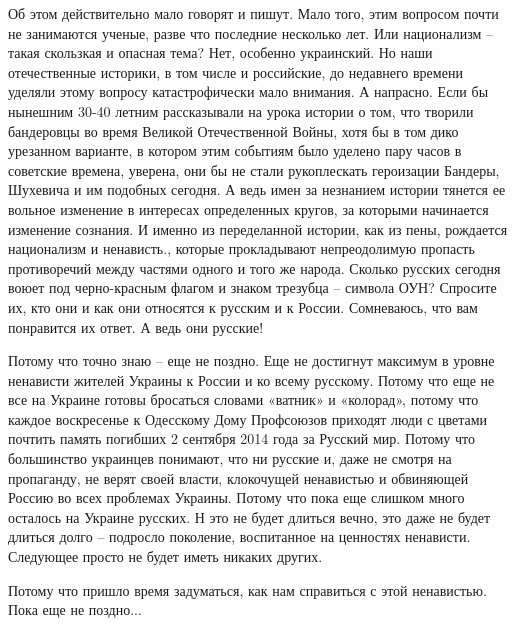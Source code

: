 Об этом действительно мало говорят и пишут. Мало того, этим вопросом почти не
занимаются ученые, разве что последние несколько лет. Или национализм – такая
скользкая и опасная тема? Нет, особенно украинский. Но наши отечественные
историки, в том числе и российские, до недавнего времени уделяли этому вопросу
катастрофически мало внимания. А напрасно. Если бы нынешним 30-40 летним
рассказывали на урока истории о том, что творили бандеровцы во время Великой
Отечественной Войны, хотя бы в том дико урезанном варианте, в котором этим
событиям было уделено пару часов в советские времена, уверена, они бы не стали
рукоплескать героизации Бандеры, Шухевича и им подобных сегодня. А ведь имен за
незнанием истории тянется ее вольное изменение в интересах определенных кругов,
за которыми начинается изменение сознания. И именно из переделанной истории,
как из пены, рождается национализм и ненависть., которые прокладывают
непреодолимую пропасть противоречий между частями одного и того же народа.
Сколько русских сегодня воюет под черно-красным флагом и знаком трезубца –
символа ОУН? Спросите их, кто они и как они относятся к русским и к России.
Сомневаюсь, что вам понравится их ответ. А ведь они русские!


Потому что точно знаю – еще не поздно. Еще не достигнут максимум в уровне
ненависти жителей Украины к России и ко всему русскому. Потому что еще не все
на Украине готовы бросаться словами «ватник» и «колорад», потому что каждое
воскресенье к Одесскому Дому Профсоюзов приходят люди с цветами почтить память
погибших 2 сентября 2014 года за Русский мир. Потому что большинство украинцев
понимают, что ни русские и, даже не смотря на пропаганду, не верят своей
власти, клокочущей ненавистью и обвиняющей Россию во всех проблемах Украины.
Потому что пока еще слишком много осталось на Украине русских. Н это не будет
длиться вечно, это даже не будет длиться долго – подросло поколение,
воспитанное на ценностях ненависти. Следующее просто не будет иметь никаких
других.

Потому что пришло время задуматься, как нам справиться с этой ненавистью. Пока
еще не поздно...
